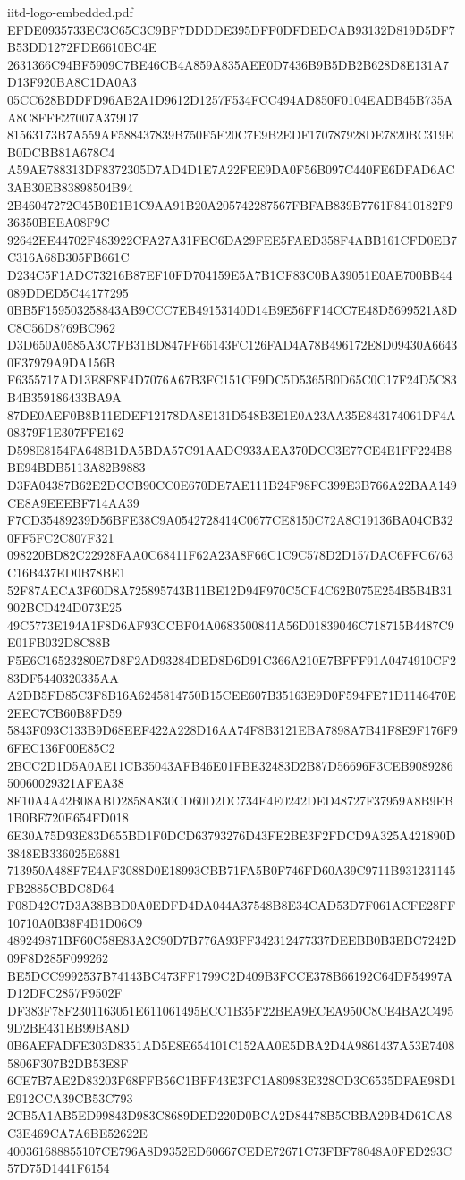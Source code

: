 \begin{filecontents*}[overwrite]{iitd-logo-embedded.pdf}
EFDE0935733EC3C65C3C9BF7DDDDE395DFF0DFDEDCAB93132D819D5DF7B53DD1272FDE6610BC4E
2631366C94BF5909C7BE46CB4A859A835AEE0D7436B9B5DB2B628D8E131A7D13F920BA8C1DA0A3
05CC628BDDFD96AB2A1D9612D1257F534FCC494AD850F0104EADB45B735AA8C8FFE27007A379D7
81563173B7A559AF588437839B750F5E20C7E9B2EDF170787928DE7820BC319EB0DCBB81A678C4
A59AE788313DF8372305D7AD4D1E7A22FEE9DA0F56B097C440FE6DFAD6AC3AB30EB83898504B94
2B46047272C45B0E1B1C9AA91B20A205742287567FBFAB839B7761F8410182F936350BEEA08F9C
92642EE44702F483922CFA27A31FEC6DA29FEE5FAED358F4ABB161CFD0EB7C316A68B305FB661C
D234C5F1ADC73216B87EF10FD704159E5A7B1CF83C0BA39051E0AE700BB44089DDED5C44177295
0BB5F159503258843AB9CCC7EB49153140D14B9E56FF14CC7E48D5699521A8DC8C56D8769BC962
D3D650A0585A3C7FB31BD847FF66143FC126FAD4A78B496172E8D09430A66430F37979A9DA156B
F6355717AD13E8F8F4D7076A67B3FC151CF9DC5D5365B0D65C0C17F24D5C83B4B359186433BA9A
87DE0AEF0B8B11EDEF12178DA8E131D548B3E1E0A23AA35E843174061DF4A08379F1E307FFE162
D598E8154FA648B1DA5BDA57C91AADC933AEA370DCC3E77CE4E1FF224B8BE94BDB5113A82B9883
D3FA04387B62E2DCCB90CC0E670DE7AE111B24F98FC399E3B766A22BAA149CE8A9EEEBF714AA39
F7CD35489239D56BFE38C9A0542728414C0677CE8150C72A8C19136BA04CB320FF5FC2C807F321
098220BD82C22928FAA0C68411F62A23A8F66C1C9C578D2D157DAC6FFC6763C16B437ED0B78BE1
52F87AECA3F60D8A725895743B11BE12D94F970C5CF4C62B075E254B5B4B31902BCD424D073E25
49C5773E194A1F8D6AF93CCBF04A0683500841A56D01839046C718715B4487C9E01FB032D8C88B
F5E6C16523280E7D8F2AD93284DED8D6D91C366A210E7BFFF91A0474910CF283DF5440320335AA
A2DB5FD85C3F8B16A6245814750B15CEE607B35163E9D0F594FE71D1146470E2EEC7CB60B8FD59
5843F093C133B9D68EEF422A228D16AA74F8B3121EBA7898A7B41F8E9F176F96FEC136F00E85C2
2BCC2D1D5A0AE11CB35043AFB46E01FBE32483D2B87D56696F3CEB908928650060029321AFEA38
8F10A4A42B08ABD2858A830CD60D2DC734E4E0242DED48727F37959A8B9EB1B0BE720E654FD018
6E30A75D93E83D655BD1F0DCD63793276D43FE2BE3F2FDCD9A325A421890D3848EB336025E6881
713950A488F7E4AF3088D0E18993CBB71FA5B0F746FD60A39C9711B931231145FB2885CBDC8D64
F08D42C7D3A38BBD0A0EDFD4DA044A37548B8E34CAD53D7F061ACFE28FF10710A0B38F4B1D06C9
489249871BF60C58E83A2C90D7B776A93FF342312477337DEEBB0B3EBC7242D09F8D285F099262
BE5DCC9992537B74143BC473FF1799C2D409B3FCCE378B66192C64DF54997AD12DFC2857F9502F
DF383F78F2301163051E611061495ECC1B35F22BEA9ECEA950C8CE4BA2C4959D2BE431EB99BA8D
0B6AEFADFE303D8351AD5E8E654101C152AA0E5DBA2D4A9861437A53E74085806F307B2DB53E8F
6CE7B7AE2D83203F68FFB56C1BFF43E3FC1A80983E328CD3C6535DFAE98D1E912CCA39CB53C793
2CB5A1AB5ED99843D983C8689DED220D0BCA2D84478B5CBBA29B4D61CA8C3E469CA7A6BE52622E
400361688855107CE796A8D9352ED60667CEDE72671C73FBF78048A0FED293C57D75D1441F6154

\end{filecontents*}
